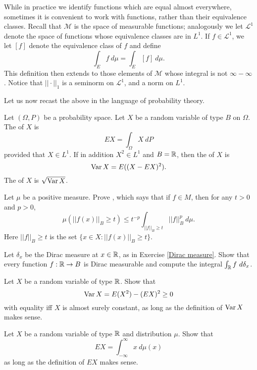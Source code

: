 \begin{subsec}
While in practice we identify functions which are equal almost everywhere, sometimes it is convenient to work with functions, rather than their equivalence classes.
Recall that $\mathcal M$ is the space of measurable functions; analogously we let $\mathcal L^1$ denote the space of functions whose equivalence classes are in $L^1$. If $f \in \mathcal L^1$, we let $[f]$ denote the equivalence class of $f$ and define
\[\int_E f ~d\mu = \int_E [f]~d\mu.\]
This definition then extends to those elements of $\mathcal M$ whose integral is not $\infty - \infty$.
Notice that $||\cdot||_1$ is a seminorm on $\mathcal L^1$, and a norm on $L^1$.
\end{subsec}

\begin{subsec}
Let us now recast the above in the language of probability theory.
\end{subsec}

\begin{definition}
Let $(\Omega, P)$ be a probability space.
Let $X$ be a random variable of type $B$ on $\Omega$.
The  of $X$ is
\[EX = \int_\Omega X~dP\]
provided that $X \in L^1$.
If in addition $X^2 \in L^1$ and $B = \mathbb{R}$, then the  of $X$ is
\[\operatorname{Var} X = E((X - EX)^2).\]
The  of $X$ is $\sqrt{\operatorname{Var} X}$.
\end{definition}

\begin{exercise}
\label{Chebyshev}
Let $\mu$ be a positive measure.
Prove , which says that if $f \in M$, then for any $t > 0$ and $p > 0$,
\[\mu(||f(x)||_B \geq t) \leq t^{-p} \int_{||f||_B \geq t} ||f||_B^p~d\mu.\]
Here $||f||_B \geq t$ is the set $\{x \in X: ||f(x)||_B \geq t\}$.
\end{exercise}

\begin{exercise}
Let $\delta_x$ be the Dirac measure at $x \in \mathbb{R}$, as in Exercise \ref{Dirac measure}.
Show that every function $f: \mathbb{R} \to B$ is Dirac measurable and compute the integral $\int_{\mathbb{R}} f~d\delta_x$.
\end{exercise}

\begin{exercise}
Let $X$ be a random variable of type $\mathbb{R}$. Show that
\[\operatorname{Var} X = E(X^2) - (EX)^2 \geq 0\]
with equality iff $X$ is almost surely constant, as long as the definition of $\operatorname{Var} X$ makes sense.
\end{exercise}

\begin{exercise}
\label{integrating a distribution}
Let $X$ be a random variable of type $\mathbb{R}$ and distribution $\mu$. Show that
\[EX = \int_{-\infty}^\infty x ~d\mu(x)\]
as long as the definition of $EX$ makes sense.
\end{exercise}
